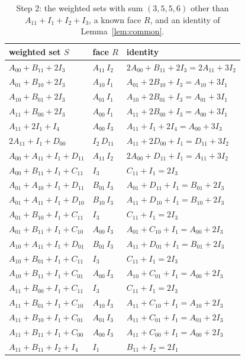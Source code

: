 \documentclass[11pt]{article}
\theoremstyle{definition}
\begin{document}
\begin{appendices}
\begin{table}[ht]
\centering\small
\caption{Step 2: the weighted sets with sum $(3,5,5,6)$ other than $A_{11}+I_1+I_2+I_3$, a known face $R$, and an identity of Lemma~\ref{lem:common}.}\label{tab:step2}
\begin{tabular}{lll}
\toprule
weighted set $S$ & face $R$ & identity\\
\midrule
$A_{00}+B_{11}+2I_3$ & $A_{11}\,I_2$ & $2A_{00}+B_{11}+2I_3=2A_{11}+3I_2$ \\
$A_{01}+B_{10}+2I_3$ & $A_{10}\,I_1$ & $A_{01}+2B_{10}+I_3=A_{10}+3I_1$ \\
$A_{10}+B_{01}+2I_3$ & $A_{01}\,I_1$ & $A_{10}+2B_{01}+I_3=A_{01}+3I_1$ \\
$A_{11}+B_{00}+2I_3$ & $A_{00}\,I_1$ & $A_{11}+2B_{00}+I_3=A_{00}+3I_1$ \\
$A_{11}+2I_1+I_4$ & $A_{00}\,I_3$ & $A_{11}+I_1+2I_4=A_{00}+3I_3$ \\
$2A_{11}+I_1+D_{00}$ & $I_2\,D_{11}$ & $A_{11}+2D_{00}+I_1=D_{11}+3I_2$ \\
$A_{00}+A_{11}+I_1+D_{11}$ & $A_{11}\,I_2$ & $2A_{00}+D_{11}+I_1=A_{11}+3I_2$ \\
$A_{00}+B_{11}+I_1+C_{11}$ & $I_3$ & $C_{11}+I_1=2I_3$ \\
$A_{01}+A_{10}+I_1+D_{11}$ & $B_{01}\,I_3$ & $A_{01}+D_{11}+I_1=B_{01}+2I_3$ \\
$A_{01}+A_{11}+I_1+D_{10}$ & $B_{10}\,I_3$ & $A_{11}+D_{10}+I_1=B_{10}+2I_3$ \\
$A_{01}+B_{10}+I_1+C_{11}$ & $I_3$ & $C_{11}+I_1=2I_3$ \\
$A_{01}+B_{11}+I_1+C_{10}$ & $A_{00}\,I_3$ & $A_{01}+C_{10}+I_1=A_{00}+2I_3$ \\
$A_{10}+A_{11}+I_1+D_{01}$ & $B_{01}\,I_3$ & $A_{11}+D_{01}+I_1=B_{01}+2I_3$ \\
$A_{10}+B_{01}+I_1+C_{11}$ & $I_3$ & $C_{11}+I_1=2I_3$ \\
$A_{10}+B_{11}+I_1+C_{01}$ & $A_{00}\,I_3$ & $A_{10}+C_{01}+I_1=A_{00}+2I_3$ \\
$A_{11}+B_{00}+I_1+C_{11}$ & $I_3$ & $C_{11}+I_1=2I_3$ \\
$A_{11}+B_{01}+I_1+C_{10}$ & $A_{10}\,I_3$ & $A_{11}+C_{10}+I_1=A_{10}+2I_3$ \\
$A_{11}+B_{10}+I_1+C_{01}$ & $A_{01}\,I_3$ & $A_{11}+C_{01}+I_1=A_{01}+2I_3$ \\
$A_{11}+B_{11}+I_1+C_{00}$ & $A_{00}\,I_3$ & $A_{11}+C_{00}+I_1=A_{00}+2I_3$ \\
$A_{11}+B_{11}+I_2+I_4$ & $I_1$ & $B_{11}+I_2=2I_1$ \\
\bottomrule
\end{tabular}
\end{table}


\end{appendices}
\end{document}
